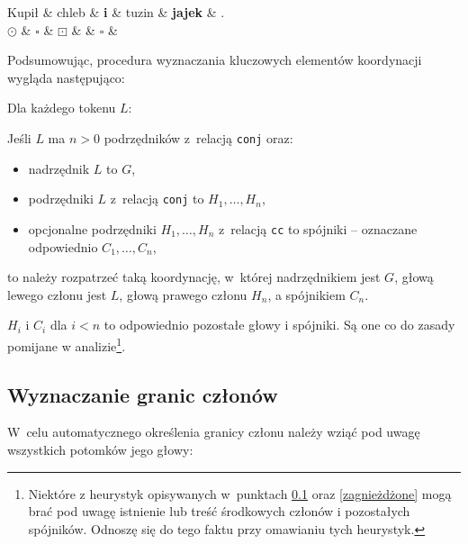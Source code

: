 \begin{exe}
\ex \label{C}
\begin{dependency}[baseline=0.9ex]
\begin{deptext}[column sep=1em, row sep=.1ex]
Kupił \& chleb \& \textbf{i} \& tuzin \& \textbf{jajek} \& .  \\ 
$\odot$ \& $\square$ \& \textbf{$\boxdot$} \& \& $\square$ \& \\ 
\end{deptext}
\end{dependency}
\end{exe}

Podsumowując, procedura wyznaczania kluczowych elementów koordynacji wygląda następująco:

\begin{exe}
\ex 	\label{procedura}
Dla każdego tokenu $L$:

Jeśli $L$ ma $n>0$ podrzędników z~relacją \texttt{conj} oraz:

\begin{itemize}
\item nadrzędnik $L$ to $G$,
\item podrzędniki $L$ z~relacją \texttt{conj} to $H_{1}, \ldots , H_{n}$,
\item opcjonalne podrzędniki $H_{1}, \ldots , H_{n}$ z~relacją \texttt{cc} to spójniki -- oznaczane odpowiednio $C_{1}, \ldots , C_{n}$,
\end{itemize}

to należy rozpatrzeć taką koordynację, w~której nadrzędnikiem jest $G$, głową lewego członu jest $L$, głową prawego członu $H_{n}$, a spójnikiem $C_{n}$.
\end{exe}

$H_{i}$ i $C_{i}$ dla $i<n$ to odpowiednio pozostałe głowy i spójniki. Są one co do zasady pomijane w analizie\footnote{
Niektóre z heurystyk opisywanych w~punktach \ref{heurystyki} oraz \ref{zagnieżdżone} mogą brać pod uwagę istnienie lub treść środkowych członów i pozostałych spójników. Odnoszę się do tego faktu przy omawianiu tych heurystyk.}.

\subsection{Wyznaczanie granic członów} \label{heurystyki}

W~celu automatycznego określenia granicy członu należy wziąć pod uwagę wszystkich potomków jego głowy:

